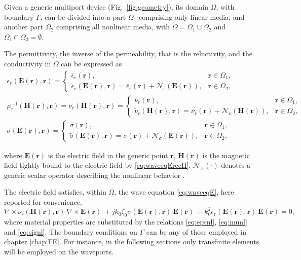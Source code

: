 Given a generic multiport device (Fig.~\ref{fig:geometry}), its
domain $\Omega$, with boundary $\Gamma$, can be divided into a part $\Omega_1$ comprising only linear media, and another part $\Omega_2$ comprising all nonlinear media, with $\Omega = \Omega_1 \cup \Omega_2$ and
$\Omega_1 \cap \Omega_2 = \emptyset$.

The permittivity, the inverse of the permeability, that is the reluctivity, and the conductivity in $\Omega$ can be expressed as 
%
\begin{gather}
\epsilon_r(\mathbf{E}(\mathbf{r}),\mathbf{r}) = 
\begin{cases}
\bar{\epsilon}_r(\mathbf{r}), & \mathbf{r} \in \Omega_1,  \\
\tilde{\epsilon}_r(\mathbf{E}(\mathbf{r}), \mathbf{r}) \!=\!
\bar{\epsilon}_r(\mathbf{r}) \!+\! \mathcal{N}_\epsilon(\mathbf{E}(\mathbf{r})), & \mathbf{r} \in
\Omega_2,
\end{cases} \label{eq:epsnl}\\
\mu_r^{-1}(\mathbf{H}(\mathbf{r}),\mathbf{r}) = \nu_r(\mathbf{H}(\mathbf{r}),\mathbf{r}) = 
\begin{cases}
\bar{\nu}_r(\mathbf{r}), & \mathbf{r} \in \Omega_1, \\
\tilde{\nu}_r(\mathbf{H}(\mathbf{r}), \mathbf{r}) \!=\!
\bar{\nu}_r(\mathbf{r}) \!+\! \mathcal{N}_\nu(\mathbf{H}(\mathbf{r})), & \mathbf{r} \in
\Omega_2,
\end{cases}\label{eq:munl}\\
\sigma(\mathbf{E}(\mathbf{r}),\mathbf{r}) = 
\begin{cases}
\bar{\sigma}(\mathbf{r}), & \mathbf{r} \in \Omega_1, \\
\tilde{\sigma}(\mathbf{E}(\mathbf{r}), \mathbf{r}) \!=\!
\bar{\sigma}(\mathbf{r}) \!+\! \mathcal{N}_\sigma(\mathbf{E}(\mathbf{r})), & \mathbf{r} \in
\Omega_2,
\end{cases}\label{eq:signl}
\end{gather}

\noindent where $\mathbf{E}(\mathbf{r})$ is the electric field in the generic point
$\mathbf{r}$, $\mathbf{H}(\mathbf{r})$ is the magnetic field tightly bound to the electric field by \eqref{eq:waveeqErecH}. $\mathcal{N}_\times(\cdot)$ denotes a generic scalar operator describing the nonlinear behavior \cite{Guarnieri2010}. 

The electric field satisfies, within $\Omega$, the wave equation \eqref{eq:waveeqE}, here reported for convenience,
\begin{equation}
\nabla \times \nu_r(\mathbf{H}(\mathbf{r}),\mathbf{r}) \ \nabla \times {\mathbf{E}(\mathbf{r})} \ + j k_0 \zeta_0 \sigma(\mathbf{E}(\mathbf{r}),\mathbf{r}) \ {\mathbf{E}(\mathbf{r})} \ - k_0^2 \epsilon_r(\mathbf{E}(\mathbf{r}),\mathbf{r}) \ {\mathbf{E}(\mathbf{r})} = 0,\label{eq:waveeqEnl}
\end{equation}
\noindent where material properties are substituted by the relations \eqref{eq:epsnl}, \eqref{eq:munl} and \eqref{eq:signl}. The boundary conditions on $\Gamma$ can be any of those employed in chapter \ref{chap:FE}. For instance, in the following sections only transfinite elements will be employed on the waveports.

